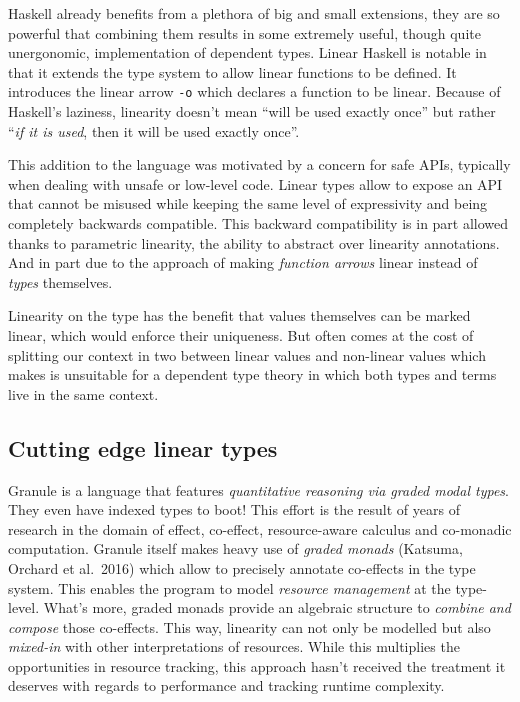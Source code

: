 \documentclass[
]{article}
\begin{document}
Haskell already benefits from a plethora of big and small extensions,
they are so powerful that combining them results in some extremely
useful, though quite unergonomic, implementation of dependent
types\cite{hasochism}. Linear Haskell\cite{linear_haskell} is notable in
that it extends the type system to allow linear functions to be defined.
It introduces the linear arrow \texttt{-o} which declares a function to
be linear. Because of Haskell's laziness, linearity doesn't mean ``will
be used exactly once'' but rather ``\emph{if it is used}, then it will
be used exactly once''.

This addition to the language was motivated by a concern for safe APIs,
typically when dealing with unsafe or low-level code. Linear types allow
to expose an API that cannot be misused while keeping the same level of
expressivity and being completely backwards compatible. This backward
compatibility is in part allowed thanks to parametric linearity, the
ability to abstract over linearity annotations. And in part due to the
approach of making \emph{function arrows} linear instead of \emph{types}
themselves.

Linearity on the type has the benefit that values themselves can be
marked linear, which would enforce their uniqueness. But often comes at
the cost of splitting our context in two\cite{lightweight_linear_types}
between linear values and non-linear values which makes is unsuitable
for a dependent type theory in which both types and terms live in the
same context.

\hypertarget{cutting-edge-linear-types}{%
\subsection{Cutting edge linear types}\label{cutting-edge-linear-types}}

Granule is a language that features \emph{quantitative reasoning via
graded modal types}. They even have indexed types to boot! This effort
is the result of years of research in the domain of effect, co-effect,
resource-aware calculus and co-monadic computation. Granule itself makes
heavy use of \emph{graded monads} (Katsuma, Orchard et al.~2016) which
allow to precisely annotate co-effects in the type system. This enables
the program to model \emph{resource management} at the type-level.
What's more, graded monads provide an algebraic structure to
\emph{combine and compose} those co-effects. This way, linearity can not
only be modelled but also \emph{mixed-in} with other interpretations of
resources. While this multiplies the opportunities in resource tracking,
this approach hasn't received the treatment it deserves with regards to
performance and tracking runtime complexity.
\end{document}
